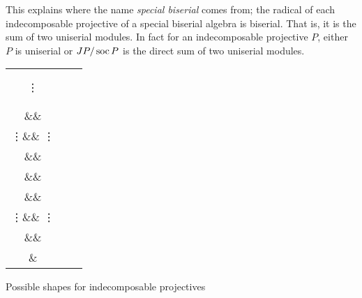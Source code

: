 This explains where the name \emph{special biserial} comes from; the radical of each indecomposable projective of a special biserial algebra is biserial. That is, it is the sum of two uniserial modules. In fact for an indecomposable projective $P$, either $P$ is uniserial or $JP/\operatorname{soc} P$ is the direct sum of two uniserial modules.

\begin{center}
\setlength{\tabcolsep}{30pt}
\begin{tabular}{ccc}
	\begin{tikzcd}
	\bullet\ar[d]\\
	\bullet\ar[d]\\
	\vdots\ar[d]\\
	\bullet\ar[d]\\
	\bullet
	\end{tikzcd}
	&
	\begin{tikzcd}[ampersand replacement=\&, column sep = 10pt]
	\&\bullet\ar[dl]\ar[dr]\\
	\bullet\ar[d] \&\& \bullet\ar[d]\\
	\vdots\ar[d] \&\& \vdots\ar[d]\\
	\bullet \&\& \bullet\ar[d]\\
	\&\&\bullet
	\end{tikzcd}
	&
	\begin{tikzcd}[ampersand replacement=\&, column sep = 10pt]
	\&\bullet\ar[dl]\ar[dr]\\
	\bullet\ar[d] \&\& \bullet\ar[d]\\
	\vdots\ar[d] \&\& \vdots\ar[d]\\
	\bullet\ar[dr] \&\& \bullet\ar[dl]\\
	\&\bullet
	\end{tikzcd}
\end{tabular}

Possible shapes for indecomposable projectives
\end{center}